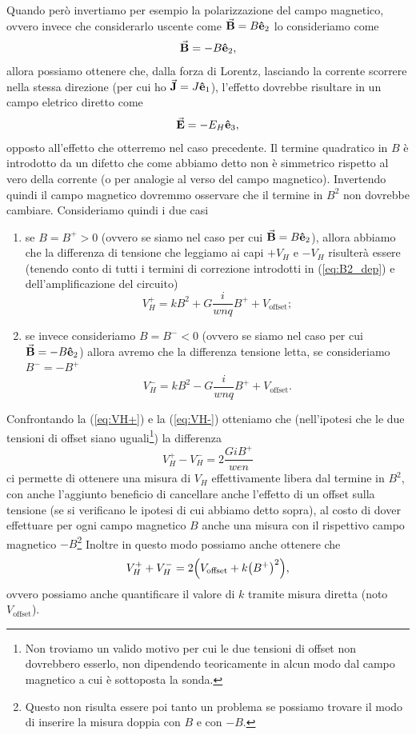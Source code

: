 \documentclass[fleqn,varvw]{memo}
\begin{document}
Quando però invertiamo per esempio la polarizzazione del campo magnetico, ovvero invece che considerarlo uscente come $\va{B} = B\vu{e}_2$ lo consideriamo come \begin{equation}
    \va{B} = -B\vu{e}_2,    
\end{equation} allora possiamo ottenere che, dalla forza di Lorentz, lasciando la corrente scorrere nella stessa direzione (per cui ho $\va{J} = J\vu{e}_1$), l'effetto dovrebbe risultare in un campo eletrico diretto come \begin{equation}
    \va{E} = -E_H \vu{e}_3,
\end{equation} opposto all'effetto che otterremo nel caso precedente. Il termine quadratico in $B$ è introdotto da un difetto che come abbiamo detto non è simmetrico rispetto al vero della corrente (o per analogie al verso del campo magnetico). Invertendo quindi il campo magnetico dovremmo osservare che il termine in $B^2$ non dovrebbe cambiare. Consideriamo quindi i due casi \begin{enumerate}[1.]
    \item se $B=B^+>0$ (ovvero se siamo nel caso per cui $\va{B} = B\vu{e}_2$), allora abbiamo che la differenza di tensione che leggiamo ai capi $+V_H$ e $-V_H$ risulterà essere (tenendo conto di tutti i termini di correzione introdotti in (\ref{eq:B2_dep}) e dell'amplificazione del circuito) \begin{equation}
        V_H^+ = kB^2 + G\frac{i}{wnq}B^+ + V_\text{offset};\label{eq:VH+}
    \end{equation}
    \item se invece consideriamo $B=B^-<0$ (ovvero se siamo nel caso per cui $\va{B} = -B\vu{e}_2$) allora avremo che la differenza tensione letta, se consideriamo $B^- = -B^+$ \begin{equation}
        V_H^- = kB^2 - G\frac{i}{wnq}B^+ + V_\text{offset}.\label{eq:VH-}
    \end{equation}
\end{enumerate}
Confrontando la (\ref{eq:VH+}) e la (\ref{eq:VH-}) otteniamo che (nell'ipotesi che le due tensioni di offset siano uguali\footnote{Non troviamo un valido motivo per cui le due tensioni di offset non dovrebbero esserlo, non dipendendo teoricamente in alcun modo dal campo magnetico a cui è sottoposta la sonda.}) la differenza \begin{equation}
    V_H^+ - V_H^- = 2\frac{GiB^+}{wen}
\end{equation} ci permette di ottenere una misura di $V_H$ effettivamente libera dal termine in $B^2$, con anche l'aggiunto beneficio di cancellare anche l'effetto di un offset sulla tensione (se si verificano le ipotesi di cui abbiamo detto sopra), al costo di dover effettuare per ogni campo magnetico $B$ anche una misura con il rispettivo campo magnetico $-B$\footnote{Questo non risulta essere poi tanto un problema se possiamo trovare il modo di inserire la misura doppia con $B$ e con $-B$.} Inoltre in questo modo possiamo anche ottenere che \begin{equation}
    V_H^++V_H^- = 2\qty(V_\text{offset} + k\qty(B^+)^2),
\end{equation} ovvero possiamo anche quantificare il valore di $k$ tramite misura diretta (noto $V_\text{offset}$).
\end{document}

